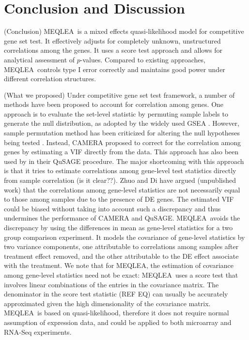 \documentclass[a4,center,fleqn]{NAR}
\newcommand{\OurMethod}{MEQLEA}
\begin{document}
	\section{Conclusion and Discussion}\label{section:conclusion}
	
	(Conclusion) \OurMethod~is a mixed effects quasi-likelihood model for competitive gene set test. It
	effectively adjusts for completely unknown, unstructured correlations among the genes. It uses a
	score test approach and allows for analytical assessment of $p$-values. Compared to existing
	approaches, \OurMethod~controls type I error correctly and maintains good power under different
	correlation structures.  
	
	
	(What we proposed) Under competitive gene set test framework, a number of methods have been
	proposed to account for correlation among genes. One approach is to evaluate the set-level statistic
	by permuting sample labels to generate the null distribution, as adopted by the widely used GSEA
	\citep{subramanian2005gene}. However, sample permutation method has been criticized for  altering
	the null hypotheses being tested \citep{goeman2007analyzing, khatri2012ten}. Instead, CAMERA
	\citep{wu2012camera} proposed to correct for the correlation among genes by estimating a VIF
	directly from the data. This approach has also been used by \citet{yaari2013quantitative} in their
	QuSAGE procedure. The major shortcoming with this approach is that it tries to estimate correlations
	among gene-level test statistics directly from sample correlation (is it clear??). Zhuo and Di have
	argued (unpublished work) that the correlations among gene-level statistics are not necessarily
	equal to those among samples due to the presence of DE genes. The estimated VIF could be biased
	without taking into account such a discrepancy and thus undermines the performance of CAMERA and
	QuSAGE. \OurMethod~avoids the discrepancy by using the differences in mean as gene-level statistics
	for a two group comparison experiment. It models the covariance of gene-level statistics by two
	variance components, one attributable to correlations among samples after treatment effect removed,
	and the other attributable to the DE effect associate with the treatment. We note that for
	\OurMethod, the estimation of covariance among gene-level statistics need not be exact:
	\OurMethod~uses a score test that involves linear combinations of the entries in the covariance
	matrix. The denominator in the score test statistic (REF EQ) can usually be accurately approximated
	given the high dimensionality of the covariance matrix. \OurMethod~is based on quasi-likelihood,
	therefore it does not require normal assumption of expression data, and could be applied to both
	microarray and RNA-Seq experiments. 
	
\end{document}
